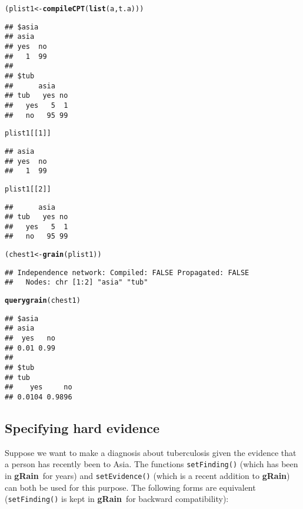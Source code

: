 \documentclass[10pt]{article}\usepackage[]{graphicx}\usepackage[]{color}
\makeatletter
\newcommand{\hlnum}[1]{\textcolor[rgb]{0.686,0.059,0.569}{#1}}%
\newcommand{\hlstd}[1]{\textcolor[rgb]{0.345,0.345,0.345}{#1}}%
\newcommand{\hlkwb}[1]{\textcolor[rgb]{0.69,0.353,0.396}{#1}}%
\newcommand{\hlkwd}[1]{\textcolor[rgb]{0.737,0.353,0.396}{\textbf{#1}}}%
\newenvironment{kframe}{%
 \def\at@end@of@kframe{}%
 \ifinner\ifhmode%
  \def\at@end@of@kframe{\end{minipage}}%
  \begin{minipage}{\columnwidth}%
 \fi\fi%
 \def\FrameCommand##1{\hskip\@totalleftmargin \hskip-\fboxsep
 \colorbox{shadecolor}{##1}\hskip-\fboxsep
     \hskip-\linewidth \hskip-\@totalleftmargin \hskip\columnwidth}%
 \MakeFramed {\advance\hsize-\width
   \@totalleftmargin\z@ \linewidth\hsize
   \@setminipage}}%
 {\par\unskip\endMakeFramed%
 \at@end@of@kframe}
\newenvironment{knitrout}{}{} %
\def\grbn{{\bf gRain}}
\def\code#1{{\texttt{#1}}}
\makeatother
\begin{document}
\begin{knitrout}
\begin{kframe}
\begin{alltt}
\hlstd{(plist1} \hlkwb{<-} \hlkwd{compileCPT}\hlstd{(}\hlkwd{list}\hlstd{(a, t.a)))}
\end{alltt}
\begin{verbatim}
## $asia
## asia
## yes  no 
##   1  99 
## 
## $tub
##      asia
## tub   yes no
##   yes   5  1
##   no   95 99
\end{verbatim}
\begin{alltt}
\hlstd{plist1[[}\hlnum{1}\hlstd{]]}
\end{alltt}
\begin{verbatim}
## asia
## yes  no 
##   1  99
\end{verbatim}
\begin{alltt}
\hlstd{plist1[[}\hlnum{2}\hlstd{]]}
\end{alltt}
\begin{verbatim}
##      asia
## tub   yes no
##   yes   5  1
##   no   95 99
\end{verbatim}
\begin{alltt}
\hlstd{(chest1} \hlkwb{<-} \hlkwd{grain}\hlstd{(plist1))}
\end{alltt}
\begin{verbatim}
## Independence network: Compiled: FALSE Propagated: FALSE 
##   Nodes: chr [1:2] "asia" "tub"
\end{verbatim}
\begin{alltt}
\hlkwd{querygrain}\hlstd{(chest1)}
\end{alltt}
\begin{verbatim}
## $asia
## asia
##  yes   no 
## 0.01 0.99 
## 
## $tub
## tub
##    yes     no 
## 0.0104 0.9896
\end{verbatim}
\end{kframe}
\end{knitrout}

\subsection{Specifying hard evidence}
\label{sec:hard-evidence}

Suppose we want to make a diagnosis about tuberculosis given the
evidence that a person has recently been to Asia. The functions
\code{setFinding()} (which has been in \grbn\ for years) and
\code{setEvidence()} (which is a recent addition to \grbn) can both be used for this
purpose. The following forms are equivalent (\verb|setFinding()| is kept in \grbn\ for backward compatibility):
\end{document}
